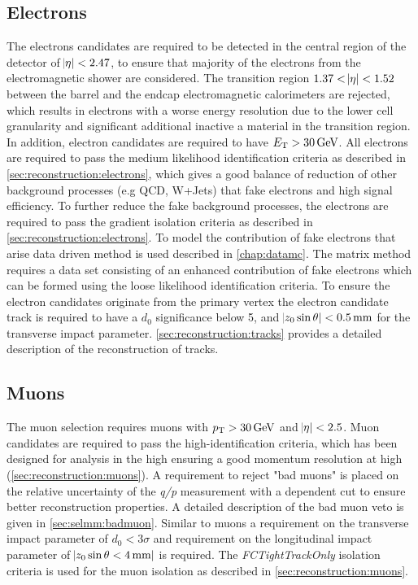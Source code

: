 \subsection{Electrons}\label{sec:selee}
The electrons candidates are required to be detected in the central region of the detector of $\abs{\eta} < 2.47$, to ensure that majority of the electrons from the electromagnetic shower are considered. The transition region $1.37 < \abs{\eta} < 1.52$ between the barrel and the endcap electromagnetic calorimeters are rejected, which results in electrons with a worse energy resolution due to the lower cell granularity and significant additional inactive a material in the transition region. In addition, electron candidates are required to have $E_{\text{T}} > \SI{30}{\giga\electronvolt}$. All electrons are required to pass the medium likelihood identification criteria as described in \cref{sec:reconstruction:electrons}, which gives a good balance of reduction of other background processes (e.g QCD, W+Jets) that fake electrons and high signal efficiency. To further reduce the fake background processes, the electrons are required to pass the gradient isolation criteria as described in \cref{sec:reconstruction:electrons}. To model the contribution of fake electrons that arise data driven method is used described in \cref{chap:datamc}. The matrix method requires a data set consisting of an enhanced contribution of fake electrons which can be formed using the loose likelihood identification criteria. To ensure the electron candidates originate from the primary vertex the electron candidate track is required to have a $d_0$ significance below 5, and $\abs{z_0 \sin\theta} < \SI{0.5}{\milli\meter}$ for the transverse impact parameter. \cref{sec:reconstruction:tracks} provides a detailed description of the reconstruction of tracks.

\subsection{Muons}\label{sec:selmm}
The muon selection requires muons with $p_{\text{T}} > \SI{30}{\giga\electronvolt}$ and $\abs{\eta} < 2.5$. Muon candidates are required to pass the high-\pt identification criteria, which has been designed for analysis in the high \pt ensuring a good momentum resolution at high \pt (\cref{sec:reconstruction:muons}). A requirement to reject "bad muons" is placed on the relative uncertainty of the \emph{q/p} measurement with a \pt dependent cut to ensure better reconstruction properties. A detailed description of the bad muon veto is given in \cref{sec:selmm:badmuon}. Similar to muons a requirement on the transverse impact parameter of $d_0 < 3 \sigma$ and requirement on the longitudinal impact parameter of $\abs{z_0\sin\theta < \SI{4}{\milli\meter}}$ is required. The \emph{FCTightTrackOnly} isolation criteria is used for the muon isolation as described in \cref{sec:reconstruction:muons}.

